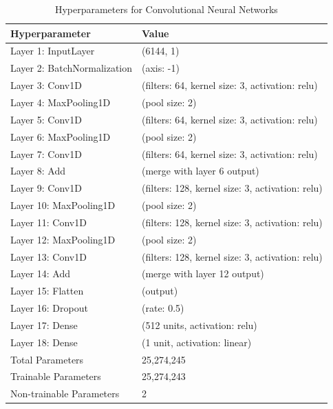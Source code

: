 \clearpage
\begin{table}[H]
\centering
\caption{Hyperparameters for Convolutional Neural Networks}
\begin{tabular}{ll}
    \toprule
    \textbf{Hyperparameter} & \textbf{Value} \\
    \midrule
    Layer 1: InputLayer & (6144, 1) \\
    Layer 2: BatchNormalization & (axis: -1) \\
    Layer 3: Conv1D & (filters: 64, kernel size: 3, activation: relu) \\
    Layer 4: MaxPooling1D & (pool size: 2) \\
    Layer 5: Conv1D & (filters: 64, kernel size: 3, activation: relu) \\
    Layer 6: MaxPooling1D & (pool size: 2) \\
    Layer 7: Conv1D & (filters: 64, kernel size: 3, activation: relu) \\
    Layer 8: Add & (merge with layer 6 output) \\
    Layer 9: Conv1D & (filters: 128, kernel size: 3, activation: relu) \\
    Layer 10: MaxPooling1D & (pool size: 2) \\
    Layer 11: Conv1D & (filters: 128, kernel size: 3, activation: relu) \\
    Layer 12: MaxPooling1D & (pool size: 2) \\
    Layer 13: Conv1D & (filters: 128, kernel size: 3, activation: relu) \\
    Layer 14: Add & (merge with layer 12 output) \\
    Layer 15: Flatten & (output) \\
    Layer 16: Dropout & (rate: 0.5) \\
    Layer 17: Dense & (512 units, activation: relu) \\
    Layer 18: Dense & (1 unit, activation: linear) \\
    Total Parameters & 25,274,245 \\
    Trainable Parameters & 25,274,243 \\
    Non-trainable Parameters & 2 \\
    \bottomrule
\end{tabular}
\label{tab:cnn_hyperparameters}
\end{table}
\FloatBarrier